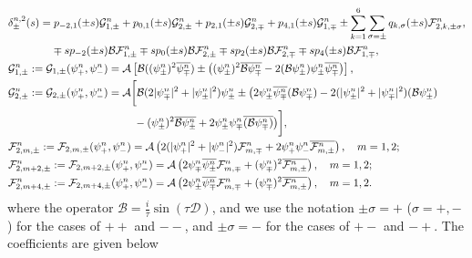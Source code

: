 \documentclass[final,leqno,showlabe]{siamltex}
\begin{document}
\begin{align}
&\delta_{\pm}^{n,2}(s)=p_{-2,1}(\pm s)\mathcal{G}_{1,\pm}^n+ p_{0,1}(\pm s)\mathcal{G}_{2,\pm}^n+ p_{2,1}(\pm s)\mathcal{G}_{2,\mp}^n+ p_{4,1}(\pm s)\mathcal{G}_{1,\mp}^n \pm\sum_{k=1}^6\sum\limits_{\sigma=\pm}q_{k,\sigma}(\pm s)\mathcal{F}_{2,k,\pm\sigma}^n,\nonumber\\
&\qquad\qquad\mp sp_{-2}(\pm s)\mathcal{B}\mathcal{F}_{1,\pm}^n\mp s p_0(\pm s)\mathcal{B}\mathcal{F}_{2,\pm}^n\mp sp_{2}(\pm s)\mathcal{B}\mathcal{F}_{2,\mp}^n\mp s p_{4}(\pm s)\mathcal{B}\mathcal{F}_{1,\mp}^n,\nonumber\\
&\mathcal{G}_{1,\pm}^n:=\mathcal{G}_{1,\pm}(\psi_+^n,\psi_-^n)=\mathcal{A}\left[\mathcal{B}((\psi_\pm^n)^2\overline{\psi_\mp^n})\pm \left((\psi_\pm^n)^2\overline{\mathcal{B}\psi_\mp^n}-2(\mathcal{B}\psi_\pm^n)\psi_\pm^n\overline{\psi_\mp^n}\right)\right],\nonumber\\
&\mathcal{G}_{2,\pm}^n:=\mathcal{G}_{2,\pm}(\psi_+^n,\psi_-^n)=\mathcal{A}\bigg[
\mathcal{B}(2|\psi_\mp^n|^2+|\psi_\pm^n|^2)\psi_\pm^n \pm\big(2\psi_\pm^n\overline{\psi_\mp^n}(\mathcal{B}\psi_\mp^n)-2(|\psi_\pm^n|^2+|\psi_{\mp}^n|^2)(\mathcal{B}\psi_\pm^n)\nonumber\\
&\hskip2cm\qquad\qquad\qquad-(\psi_\pm^n)^2\overline{\mathcal{B}\psi_\pm^n}+2\psi_\pm^n\psi_\mp^n\overline{(\mathcal{B}\psi_\mp^n)}\big)
\bigg],
\nonumber\\
&\mathcal{F}_{2,m,\pm}^n:=\mathcal{F}_{2,m,\pm}(\psi_+^n,\psi_-^n)=
\mathcal{A}\left(2(|\psi_+^n|^2+|\psi_-^n|^2)\mathcal{F}_{m,\mp}^n+ 2\psi_+^n\psi_-^n\overline{\mathcal{F}_{m,\pm}^n}\right),\quad m=1,2;\nonumber\\
&\mathcal{F}_{2,m+2,\pm}^n:=\mathcal{F}_{2,m+2,\pm}(\psi_+^n,\psi_-^n)=
\mathcal{A}\left(2\psi_{\mp}^n\overline{\psi_{\pm}^n}\mathcal{F}_{m,\mp}^n+(\psi_\mp^n)^2\overline{\mathcal{F}_{m,\pm}^n}\right),\quad m=1,2;\nonumber\\
&\mathcal{F}_{2,m+4,\pm}^n:=\mathcal{F}_{2,m+4,\pm}(\psi_+^n,\psi_-^n)=
\mathcal{A}\left(2\psi_{\pm}^n\overline{\psi_{\mp}^n}\mathcal{F}_{m,\mp}^n+(\psi_\mp^n)^2\overline{\mathcal{F}_{m,\pm}^n}\right),\quad m=1,2.\nonumber
 \end{align}
 where the operator $ \mathcal{B}=\frac{i}{\tau}\sin(\tau\mathcal{D})$, and we use the notation $\pm\sigma=+$ ($\sigma=+,-$) for the cases of $++$ and $--$, and $\pm\sigma=-$ for the cases of $+-$ and $-+$. The coefficients are given below
\end{document}
